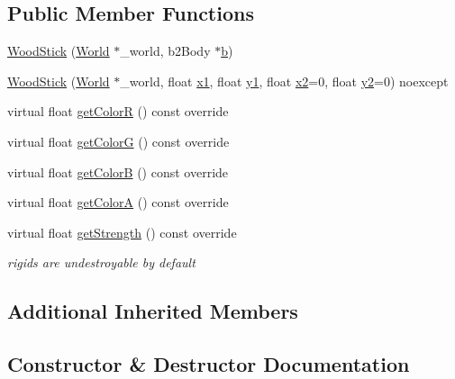 \subsection*{Public Member Functions}
\begin{DoxyCompactItemize}
\item 
\hyperlink{classWoodStick_a1695a421b0f63f1e2c6f636f889f407a}{Wood\+Stick} (\hyperlink{classWorld}{World} $\ast$\+\_\+world, b2\+Body $\ast$\hyperlink{image_8h_ab2d05693952610f937e5acb3c4a8fa1b}{b})
\item 
\hyperlink{classWoodStick_a8330706992a93b09ea599119323c8ba1}{Wood\+Stick} (\hyperlink{classWorld}{World} $\ast$\+\_\+world, float \hyperlink{classStick_a64598c448a15601cca5da6f1746db6bd}{x1}, float \hyperlink{classStick_aa90dd67e8ce5ea1ea2106ad46c05b012}{y1}, float \hyperlink{classStick_aa0c2a77310a9cbb517cfe62545bb77f4}{x2}=0, float \hyperlink{classStick_a1cae5d5fbddeb3ef7a653376da1dd2c6}{y2}=0) noexcept
\item 
virtual float \hyperlink{classWoodStick_a7c22e5a82627ab9a90fcd0236eacb4bc}{get\+Color\+R} () const override
\item 
virtual float \hyperlink{classWoodStick_a97395092b892cab30d590cb87177bcac}{get\+Color\+G} () const override
\item 
virtual float \hyperlink{classWoodStick_a2483dcaaadabd32b1a23789727b777fe}{get\+Color\+B} () const override
\item 
virtual float \hyperlink{classWoodStick_a4fd46786dec67fff538e6b6c1df6fe47}{get\+Color\+A} () const override
\item 
virtual float \hyperlink{classWoodStick_ab4fb9daa676bba37db90a5ec972aa36e}{get\+Strength} () const override
\begin{DoxyCompactList}\small\item\em rigids are undestroyable by default \end{DoxyCompactList}\end{DoxyCompactItemize}
\subsection*{Additional Inherited Members}


\subsection{Constructor \& Destructor Documentation}
\hypertarget{classWoodStick_a1695a421b0f63f1e2c6f636f889f407a}{}

